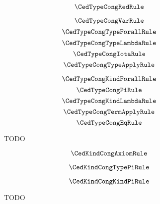 \begin{figure}
    \centering
    $$\CedTypeCongRedRule$$
    \begin{minipage}{0.5\textwidth}
        $$\CedTypeCongVarRule$$
        $$\CedTypeCongTypeForallRule$$
        $$\CedTypeCongTypeLambdaRule$$
        $$\CedTypeCongIotaRule$$
        $$\CedTypeCongTypeApplyRule$$
    \end{minipage}%
    \begin{minipage}{0.5\textwidth}
        $$\CedTypeCongKindForallRule$$
        $$\CedTypeCongPiRule$$
        $$\CedTypeCongKindLambdaRule$$
        $$\CedTypeCongTermApplyRule$$
        $$\CedTypeCongEqRule$$
    \end{minipage}%
    \caption{
        TODO
    }
    \label{fig:4:type_cong}
\end{figure}

\begin{figure}
    \centering
    $$\CedKindCongAxiomRule$$
    \begin{minipage}{0.5\textwidth}
        $$\CedKindCongTypePiRule$$
    \end{minipage}%
    \begin{minipage}{0.5\textwidth}
        $$\CedKindCongKindPiRule$$
    \end{minipage}%
    \caption{
        TODO
    }
    \label{fig:4:kind_cong}
\end{figure}
